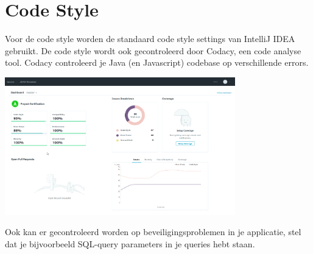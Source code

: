 \chapter{Code Style}
Voor de code style worden de standaard code style settings van IntelliJ IDEA gebruikt.
De code style wordt ook gecontroleerd door Codacy, een code analyse tool.
Codacy controleerd je Java (en Javascript) codebase op verschillende errors.

\includegraphics[width=0.75\textwidth]{images/StaticCodeAnalysis.png}

Ook kan er gecontroleerd worden op beveiligingsproblemen in je applicatie, stel dat je bijvoorbeeld SQL-query parameters in je queries hebt staan.

